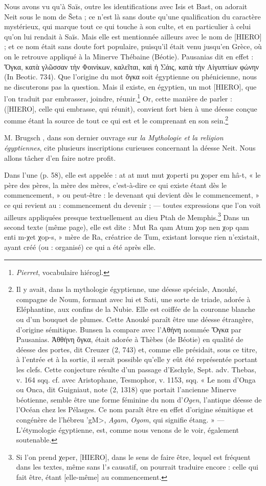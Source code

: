 \documentclass[a4paper, 11pt, oneside]{article}
\begin{document}
Nous avons vu qu'à Saïs, outre les identifications avec Isis et Bast, on adorait Neit sous le nom de Šeta ; ce n'est là sans doute qu'une qualification du caractère mystérieux, qui marque tout ce qui touche à son culte, et en particulier à celui qu'on lui rendait à Saïs. Mais elle est mentionnée ailleurs avec le nom de [HIERO] ; et ce nom était sans doute fort populaire, puisqu'il était venu jusqu'en Grèce, où on le retrouve appliqué à la Minerve Thébaine (Béotie). Pausanias dit en effet : Ὅγκα, κατὰ γλῶσσαν τὴν Φοινίκων, καλεῖται, καὶ ἡ Σάις, κατὰ τὴν Αἰγυπτίων φώνην (In Beotic. 734). Que l'origine du mot ὄγκα soit égyptienne ou phénicienne, nous ne discuterons pas la question. Mais il existe, en égyptien, un mot [HIERO], que l'on traduit par embrasser, joindre, réunir.\footnote{\emph{Pierret}, vocabulaire hiérogl.} Or, cette manière de parler : ([HIERO], celle qui embrasse, qui réunit), convient fort bien à une déesse conçue comme étant la source de tout ce qui est et le comprenant en son sein.\footnote{Il y avait, dans la mythologie égyptienne, une déesse spéciale, Anouké, compagne de Noum, formant avec lui et Sati, une sorte de triade, adorée à Eléphantine, aux confins de la Nubie. Elle est coiffée de la couronne blanche ou d'un bouquet de plumes. Cette Anouké paraît être une déesse étrangère, d'origine sémitique. Bunsen la compare avec l'Αθήνη nommée Ὄγκα par Pausanias. Ἀθθήνη ὄγκα, était adorée à Thèbes (de Béotie) en qualité de déesse des portes, dit Creuzer (2, 743) et, comme elle présidait, sous ce titre, à l'entrée et à la sortie, il serait possible qu'elle y eût été représentée portant les clefs. Cette conjecture résulte d'un passage d'Eschyle, Sept. adv. Thebas, v. 164 sqq. cf. avec Aristophane, Tesmophor, v. 1153, sqq.  « Le nom d'Onga ou Onca, dit Guigniaut, note (2, 1318) que portait l'ancienne Minerve béotienne, semble être une forme féminine du nom d'\emph{Ogen}, l'antique déesse de l'Océan chez les Pélasges. Ce nom paraît être en effet d'origine sémitique et congénère de l'hébreu \foreignlanguage{hebrew}{\<'gM>}, \emph{Agam}, \emph{Ogom}, qui signifie étang. » --- L'étymologie égyptienne, est, comme nous venons de le voir, également soutenable.}

M. Brugsch , dans son dernier ouvrage sur \emph{la Mythologie et la religion égyptiennes}, cite plusieurs inscriptions curieuses concernant la déesse Neit. Nous allons tâcher d'en faire notre profit.

Dans l'une (p. 58), elle est appelée : at at mut mut χoperti pu χoper em hâ-t, « le père des pères, la mère des mères, c'est-à-dire ce qui existe étant dès le commencement, » ou peut-être : le devenant qui devient dès le commencement, » ce qui revient au : commencement du devenir ; --- toutes expressions que l'on voit ailleurs appliquées presque textuellement au dieu Ptah de Memphis.\footnote{Si l'on prend χeper, [HIERO], dans le sens de faire être, lequel est fréquent dans les textes, même sans l'\emph{s} causatif, on pourrait traduire encore : celle qui fait être, étant [elle-même] au commencement.} Dans un second texte (même page), elle est dite : Mut Ra qam Atum χop nen χop qam enti m-χet χop-s, » mère de Ra, créatrice de Tum, existant lorsque rien n'existait, ayant créé (ou : organisé) ce qui a été après elle.
\end{document}
